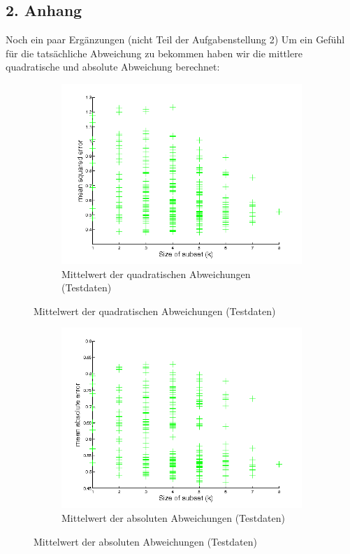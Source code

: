 \documentclass{article}
\begin{document}
\subsection*{2. Anhang}
	Noch ein paar Ergänzungen (nicht Teil der Aufgabenstellung 2)
	Um ein Gefühl für die tatsächliche Abweichung zu bekommen haben wir die mittlere quadratische und absolute Abweichung berechnet:
	\begin{figure}[H]
	  \begin{subfigure}
	    \centering
	    \includegraphics[scale=0.7,bb=0 0 576 432]{task2-mean-sq-errors.png}
		\caption{Mittelwert der quadratischen Abweichungen (Testdaten)}
	  \end{subfigure}
	\end{figure}
	\begin{figure}[H]
	  \begin{subfigure}
	    \centering
	    \includegraphics[scale=0.7,bb=0 0 576 432]{task2-mean-abs-errors.png}
		\caption{Mittelwert der absoluten Abweichungen (Testdaten)}
	  \end{subfigure}
	\end{figure}
\end{document}
